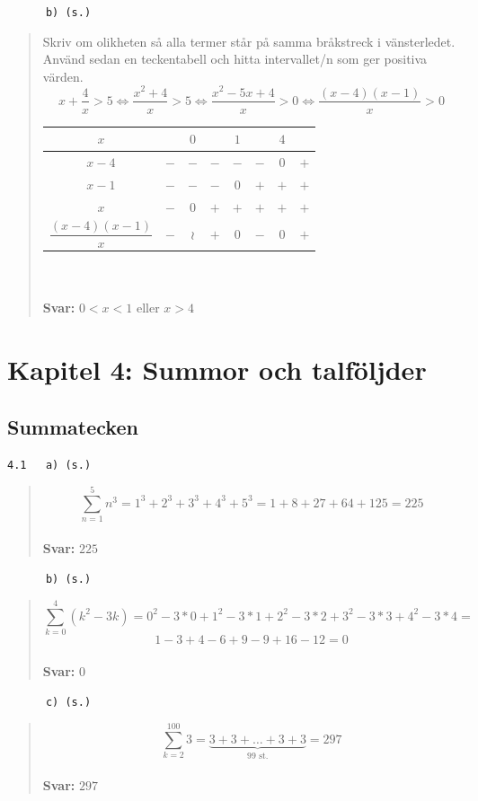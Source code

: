 \documentclass[a4paper]{article}
\newcommand{\tskcol}[1]{\textcolor{tskcol}{#1}}
\begin{document}
	\texttt{\tskcol{~~~~~~b) (s.)}}
	\begin{quotation}
		\noindent
		Skriv om olikheten så alla termer står på samma bråkstreck i vänsterledet. Använd sedan en teckentabell och hitta intervallet/n som ger positiva värden.
		\[x+\dfrac{4}{x}>5 \Leftrightarrow
		\dfrac{x^2+4}{x}>5 \Leftrightarrow
		\dfrac{x^2-5x+4}{x}>0 \Leftrightarrow
		\dfrac{(x-4)(x-1)}{x}>0\]
		\begin{tabular}{c|c|c|c|c|c|c|c}
			$x$                      &     & $0$ &     & $1$ &     & $4$ &     \\ \hline
			$x-4$                    & $-$ & $-$ & $-$ & $-$ & $-$ & $0$ & $+$ \\
			$x-1$                    & $-$ & $-$ & $-$ & $0$ & $+$ & $+$ & $+$ \\
			$x$                      & $-$ & $0$ & $+$ & $+$ & $+$ & $+$ & $+$ \\ \hline
			$\dfrac{(x-4)(x-1)}{x}$  & $-$ &$\wr$& $+$ & $0$ & $-$ & $0$ & $+$ \\
		\end{tabular}
		\\ \\
		\textbf{Svar:} $0<x<1$ eller $x>4$
	\end{quotation}
	
	\pagebreak
	\section*{Kapitel 4: Summor och talföljder}
	\subsection*{Summatecken}
	
	\texttt{\tskcol{4.1~~~a) (s.)}}
	\begin{quotation}
		\noindent
		\[\sum_{n=1}^{5}n^3=1^3+2^3+3^3+4^3+5^3=1+8+27+64+125=225\]
		\\
		\textbf{Svar:} $225$
	\end{quotation}
	
	\texttt{\tskcol{~~~~~~b) (s.)}}
	\begin{quotation}
		\noindent
		\[\sum_{k=0}^{4}(k^2-3k)=0^2-3*0+1^2-3*1+2^2-3*2+3^2-3*3+4^2-3*4=\]\[
		1-3+4-6+9-9+16-12=0\]
		\\
		\textbf{Svar:} $0$
	\end{quotation}
	
	\texttt{\tskcol{~~~~~~c) (s.)}}
	\begin{quotation}
		\noindent
		\[\sum_{k=2}^{100}3=\underbrace{3+3+\ldots+3+3}_\text{99 st.}=297\]
		\\
		\textbf{Svar:} $297$
	\end{quotation}
	
\end{document}
